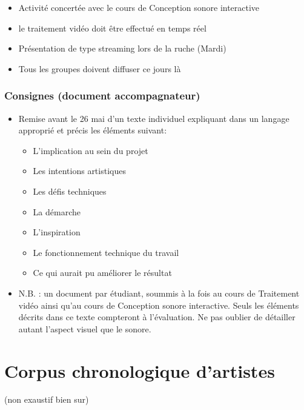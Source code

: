 \documentclass[
]{book}
\providecommand{\tightlist}{%
  \setlength{\itemsep}{0pt}\setlength{\parskip}{0pt}}
\begin{document}
\begin{itemize}
\tightlist
\item
  Activité concertée avec le cours de Conception sonore interactive
\item
  le traitement vidéo doit être effectué en temps réel
\item
  Présentation de type streaming lors de la ruche (Mardi)
\item
  Tous les groupes doivent diffuser ce jours là
\end{itemize}

\hypertarget{consignes-document-accompagnateur}{%
\subsection{Consignes (document accompagnateur)}\label{consignes-document-accompagnateur}}

\begin{itemize}
\tightlist
\item
  Remise avant le 26 mai d'un texte individuel expliquant dans un langage approprié et précis les éléments suivant:

  \begin{itemize}
  \tightlist
  \item
    L'implication au sein du projet
  \item
    Les intentions artistiques
  \item
    Les défis techniques
  \item
    La démarche
  \item
    L'inspiration
  \item
    Le fonctionnement technique du travail
  \item
    Ce qui aurait pu améliorer le résultat
  \end{itemize}
\item
  N.B. : un document par étudiant, soummis à la fois au cours de Traitement vidéo ainsi qu'au cours de Conception sonore interactive. Seuls les éléments décrits dans ce texte compteront à l'évaluation. Ne pas oublier de détailler autant l'aspect visuel que le sonore.
\end{itemize}

\hypertarget{corpus}{%
\chapter{Corpus chronologique d'artistes}\label{corpus}}

(non exaustif bien sur)
\end{document}

